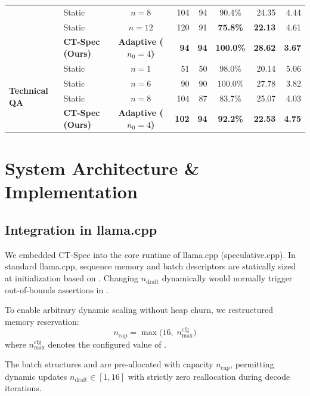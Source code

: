 \documentclass[journal,10pt,twocolumn]{IEEEtran}
\newcommand{\code}[1]{{\ttfamily\small #1}}
\newcommand{\ctspec}{\mbox{CT-Spec}}
\begin{document}
\begin{table}[!t]
\begin{tabular}{@{}llcrrcrr@{}}
& Static & $n = 8$  & 104 & 94 & \phantom{0}90.4\% & 24.35 & 4.44 \\
& Static & $n = 12$ & 120 & 91 & \phantom{0}\textbf{75.8\%} & \textbf{22.13} & 4.61 \\
& \textbf{\ctspec{} (Ours)} & \textbf{Adaptive ($n_0=4$)} & \textbf{94} & \textbf{94} & \textbf{100.0\%} & \textbf{28.62} & \textbf{3.67} \\
\midrule
\multirow{4}{*}{\textbf{Technical QA}}
& Static & $n = 1$  & 51 & 50 & \phantom{0}98.0\%  & 20.14 & 5.06 \\
& Static & $n = 6$  & 90 & 90 & 100.0\% & 27.78 & 3.82 \\
& Static & $n = 8$  & 104 & 87 & \phantom{0}83.7\%  & 25.07 & 4.03 \\
& \textbf{\ctspec{} (Ours)} & \textbf{Adaptive ($n_0=4$)} & \textbf{102} & \textbf{94} & \phantom{0}\textbf{92.2\%} & \textbf{22.53} & \textbf{4.75} \\
\bottomrule
\end{tabular}
\end{table}

\section{System Architecture \& Implementation}

\subsection{Integration in \code{llama.cpp}}
We embedded \ctspec{} into the core runtime of \code{llama.cpp} (\mbox{\code{speculative.cpp}}). In standard \code{llama.cpp}, sequence memory and batch descriptors are statically sized at initialization based on . Changing $n_{\mathrm{draft}}$ dynamically would normally trigger out-of-bounds assertions in .

To enable arbitrary dynamic scaling without heap churn, we restructured memory reservation:
\begin{equation}
n_{\mathrm{cap}} = \max\bigl(16,\; n_{\max}^{\mathrm{cfg}}\bigr)
\end{equation}
where $n_{\max}^{\mathrm{cfg}}$ denotes the configured value of .

The batch structures  and  are pre-allocated with capacity $n_{\mathrm{cap}}$, permitting dynamic updates $n_{\mathrm{draft}} \in [1, 16]$ with strictly zero reallocation during decode iterations.
\end{document}

